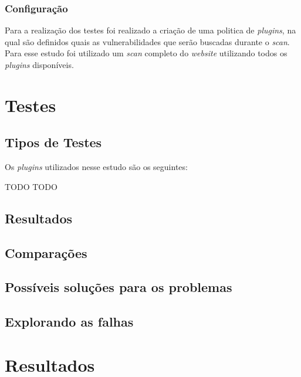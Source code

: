 \documentclass[
	12pt,				%
	openright,			%
	twoside,			%
	a4paper,			%
	english,			%
	french,				%
	spanish,			%
	brazil				%
	]{abntex2}
\begin{document}
\section{Configuração}
Para a realização dos testes foi realizado a criação de uma politica de \textit{plugins}, na qual são definidos quais as vulnerabilidades que serão buscadas durante o \textit{scan}.
\\Para esse estudo foi utilizado um \textit{scan} completo do \textit{website} utilizando todos os \textit{plugins} disponíveis.

\part{Testes}
\chapter{Tipos de Testes}
Os \textit{plugins} utilizados nesse estudo são os seguintes:
\item[TODO] TODO
\chapter{Resultados}

\chapter{Comparações}

\chapter{Possíveis soluções para os problemas}

\chapter{Explorando as falhas}

\part{Resultados}


\end{document}
